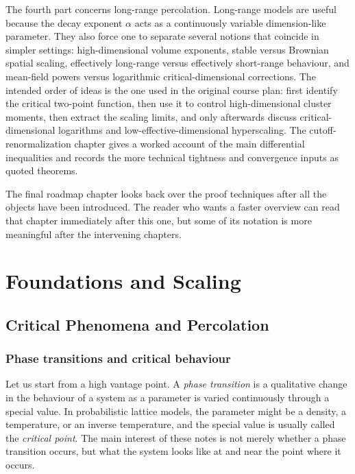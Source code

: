\documentclass[11pt,reqno]{book}
\numberwithin{equation}{chapter}
\theoremstyle{plain}
\theoremstyle{definition}
\theoremstyle{remark}
\newcommand{\1}{\mathbf 1}
\begin{document}
The fourth part concerns long-range percolation. Long-range models are useful because the decay exponent \(\alpha\) acts as a continuously variable dimension-like parameter. They also force one to separate several notions that coincide in simpler settings: high-dimensional volume exponents, stable versus Brownian spatial scaling, effectively long-range versus effectively short-range behaviour, and mean-field powers versus logarithmic critical-dimensional corrections. The intended order of ideas is the one used in the original course plan: first identify the critical two-point function, then use it to control high-dimensional cluster moments, then extract the scaling limits, and only afterwards discuss critical-dimensional logarithms and low-effective-dimensional hyperscaling. The cutoff-renormalization chapter gives a worked account of the main differential inequalities and records the more technical tightness and convergence inputs as quoted theorems.

The final roadmap chapter looks back over the proof techniques after all the objects have been introduced. The reader who wants a faster overview can read that chapter immediately after this one, but some of its notation is more meaningful after the intervening chapters.

\part{Foundations and Scaling}

\chapter{Critical Phenomena and Percolation}

\section{Phase transitions and critical behaviour}

Let us start from a high vantage point. A \emph{phase transition} is a qualitative change in the behaviour of a system as a parameter is varied continuously through a special value. In probabilistic lattice models, the parameter might be a density, a temperature, or an inverse temperature, and the special value is usually called the \emph{critical point}. The main interest of these notes is not merely whether a phase transition occurs, but what the system looks like at and near the point where it occurs.
\end{document}

